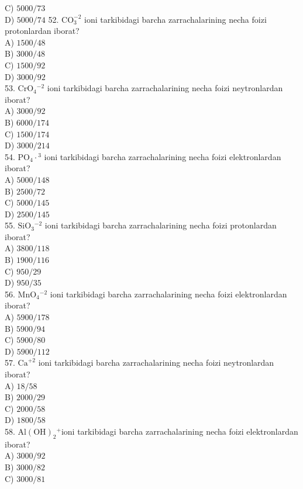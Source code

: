 C) $5000 / 73$\\
D) $5000 / 74$
52. $\mathrm{CO}_{3}^{-2}$ ioni tarkibidagi barcha zarrachalarining necha foizi protonlardan iborat?\\
A) $1500 / 48$\\
B) $3000 / 48$\\
C) $1500 / 92$\\
D) $3000 / 92$\\
53. $\mathrm{CrO}_{4}{ }^{-2}$ ioni tarkibidagi barcha zarrachalarining necha foizi neytronlardan iborat?\\
A) $3000 / 92$\\
B) $6000 / 174$\\
C) $1500 / 174$\\
D) $3000 / 214$\\
54. $\mathrm{PO}_{4} \cdot{ }^{3}$ ioni tarkibidagi barcha zarrachalarining necha foizi elektronlardan iborat?\\
A) $5000 / 148$\\
B) $2500 / 72$\\
C) $5000 / 145$\\
D) $2500 / 145$\\
55. $\mathrm{SiO}_{3}{ }^{-2}$ ioni tarkibidagi barcha zarrachalarining necha foizi protonlardan iborat?\\
A) $3800 / 118$\\
B) $1900 / 116$\\
C) $950 / 29$\\
D) $950 / 35$\\
56. $\mathrm{MnO}_{4}{ }^{-2}$ ioni tarkibidagi barcha zarrachalarining necha foizi elektronlardan iborat?\\
A) $5900 / 178$\\
B) $5900 / 94$\\
C) $5900 / 80$\\
D) $5900 / 112$\\
57. $\mathrm{Ca}^{+2}$ ioni tarkibidagi barcha zarrachalarining necha foizi neytronlardan iborat?\\
A) $18 / 58$\\
B) $2000 / 29$\\
C) $2000 / 58$\\
D) $1800 / 58$\\
58. $\mathrm{Al}(\mathrm{OH})_{2}{ }^{+}$ioni tarkibidagi barcha zarrachalarining necha foizi elektronlardan iborat?\\
A) $3000 / 92$\\
B) $3000 / 82$\\
C) $3000 / 81$\\
